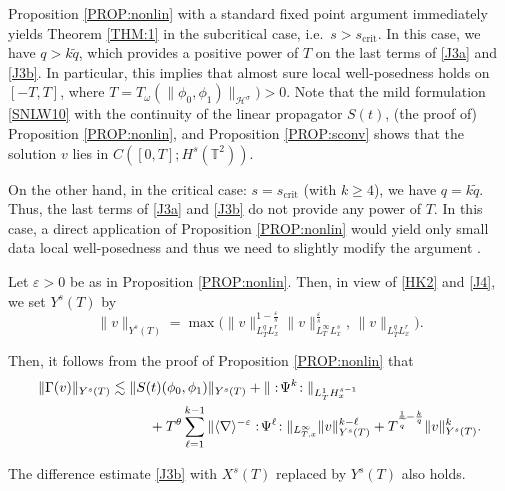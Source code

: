 \documentclass[letterpaper, 11pt,  reqno]{amsart}
\newcommand{\1}{\hspace{0.5mm}\text{I}\hspace{0.5mm}}
\newcommand{\noi}{\noindent}
\newcommand{\T}{\mathbb{T}}
\newcommand{\nb}{\nabla}
\newcommand{\eps}{\varepsilon}
\newcommand{\G}{\Gamma}
\newcommand{\s}{\sigma}
\newcommand{\wt}{\widetilde}
\renewcommand{\l}{\ell}
\renewcommand{\o}{\omega}
\newcommand{\les}{\lesssim}
\newcommand{\jb}[1]
{\langle #1 \rangle}
\renewcommand{\H}{\mathcal{H}}
\numberwithin{equation}{section}
\numberwithin{theorem}{section}
\begin{document}
Proposition \ref{PROP:nonlin}
with a standard fixed point argument
immediately yields Theorem \ref{THM:1}
in the subcritical case, i.e.~$s > s_\text{crit}$.
In this case, we have $ q> k \wt q$, which  provides a positive power of $T$
on  the last terms of \eqref{J3a} and \eqref{J3b}. 
In particular, this implies that almost sure local well-posedness
holds on $[-T, T]$, where  $T = T_\o(\|\phi_0, \phi_1)\|_{\H^\s})> 0$.
Note that 
the mild formulation \eqref{SNLW10}
with  the continuity of the linear propagator $S(t)$,
(the proof of) Proposition \ref{PROP:nonlin},
and Proposition \ref{PROP:sconv}
shows that the solution $v$ lies in $C([0, T]; H^s(\T^2))$.

On the other hand, in the critical case:
$s = s_\text{crit}$ (with  $k \geq 4$), 
 we have $ q= k \wt q$.
 Thus,   the last terms of \eqref{J3a} and \eqref{J3b}
 do not provide any power of $T$.
In this case, a direct application of Proposition \ref{PROP:nonlin}
 would yield only small data local well-posedness
 and thus we need to slightly  modify the argument .


Let $\eps > 0$ be as in Proposition \ref{PROP:nonlin}.
Then,  in view of \eqref{HK2} and \eqref{J4}, 
we set $Y^s(T)$ by 
\[ \| v\|_{Y^s(T)} = \max \big(\|v \|_{L^{q}_TL^r_x}^{1-\frac{\eps}s}   \| v \|_{L^\infty_T L^s_x}^{\frac{\eps}s}  , \,
\|v \|_{L^{q}_TL^r_x}\big).\]


\noi
Then, it follows from the proof of Proposition \ref{PROP:nonlin} that 
\begin{align} 
\| \G(v) \|_{Y^s(T)} 
& \les
\|S(t)(\phi_0, \phi_1)\|_{Y^s(T)}
+ \| :\!\Psi^k\!: \|_{L^1_TH^{s-1}_x} \notag\\
& \hphantom{XXX}+   T^\theta \sum_{\l=1}^{k-1} \|\jb{\nb}^{-\eps} :\!\Psi^\l\!: \|_{L^\infty_{T, x}} 
\| v \|_{Y^s(T)}^{k-\l}  
 +  T^{\frac{1}{\wt q}-\frac kq} 
\| v \|_{Y^s(T)}^k .  
\label{J10}
\end{align}

\noi
The difference estimate \eqref{J3b} with $X^s(T)$ replaced by $Y^s(T)$ also holds.
\end{document}
